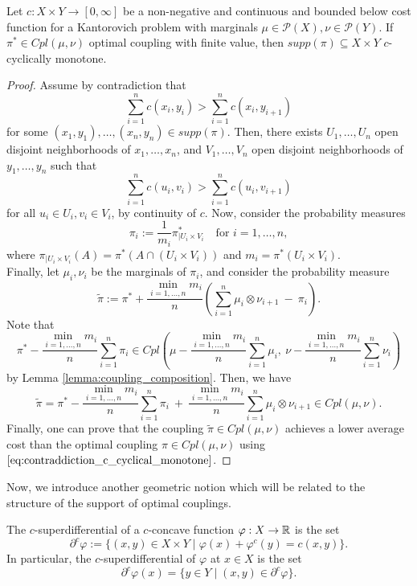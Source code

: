 \documentclass[../main.tex]{subfiles}
\begin{document}
\begin{proposition}
    \label{lemma:optimal_implies_cm}
    Let $c: X\times Y \to [0, \infty]$ be a non-negative and continuous and bounded below cost function for a Kantorovich problem with marginals $\mu\in\mathcal{P}(X), \nu\in\mathcal{P}(Y)$. If $\pi^* \in Cpl(\mu, \nu)$ optimal coupling with finite value, then $supp(\pi)\subseteq X\times Y$ $c$-cyclically monotone. 
\end{proposition}
\begin{proof}
    Assume by contradiction that $$\sum_{i=1}^n c(x_i, y_i) > \sum_{i=1}^n c(x_i, y_{i+1})$$ for some $(x_1, y_1), \dots, (x_n, y_n)\in supp(\pi)$. Then, there exists $U_1, \dots, U_n$ open disjoint neighborhoods of $x_1, \dots, x_n$, and $V_1, \dots, V_n$ open disjoint neighborhoods of $y_1, \dots, y_n$ such that 
    \begin{equation}
    \label{eq:contraddiction_c_cyclical_monotone}
        \sum_{i=1}^n c(u_i, v_i) > \sum_{i=1}^n c(u_i, v_{i+1})
    \end{equation}
    for all $u_i\in U_i, v_i\in V_i$, by continuity of $c$. 
    Now, consider the probability measures $$\pi_i := \frac{1}{m_i} \pi^*_{|U_i\times V_i} \quad \text{for $i=1, \dots, n$},$$ where $\pi_{|U_i\times V_i}(A) = \pi^*(A \cap (U_i \times V_i))$ and $m_i = \pi^*(U_i \times V_i)$. \\
    Finally, let $\mu_i, \nu_i$ be the marginals of $\pi_i$, and consider the probability measure
    $$
    \tilde\pi := \pi^* + \frac{\min_{i=1, \dots, n} m_i}{n} \left(\sum_{i=1}^n \mu_i\otimes \nu_{i+1} \ - \ \pi_i \right).
    $$
    Note that 
    $$
    \pi^* - \frac{\min_{i=1,\dots,n} m_i}{n} \sum_{i=1}^n \pi_i \in Cpl\left(\mu - \frac{\min_{i=1,\dots,n} m_i}{n}\sum_{i=1}^n \mu_i, \ \nu - \frac{\min_{i=1,\dots,n} m_i}{n}\sum_{i=1}^n \nu_i\right)
    $$
    by Lemma \ref{lemma:coupling_composition}. Then, we have
    $$
    \tilde \pi = \pi^* - \frac{\min_{i=1,\dots,n} m_i}{n}\sum_{i=1}^n \pi_i \ + \ \frac{\min_{i=1,\dots,n} m_i}{n} \sum_{i=1}^n \mu_i\otimes\nu_{i+1} \in Cpl(\mu, \nu). 
    $$
    Finally, one can prove that the coupling $\tilde \pi\in Cpl(\mu, \nu)$ achieves a lower average cost than the optimal coupling $\pi\in Cpl(\mu, \nu)$ using $\ref{eq:contraddiction_c_cyclical_monotone}$.
\end{proof}

Now, we introduce another geometric notion which will be related to the structure of the support of optimal couplings.

\begin{definition}
    The $c$-superdifferential of a $c$-concave function $\varphi : X \to \mathbb{R}$ is the set $$\partial^c \varphi := \{(x, y)\in  X \times Y \mid \varphi(x) + \varphi^c(y) = c(x, y)\}.$$
    In particular, the $c$-superdifferential of $\varphi$ at $x\in X$ is the set $$\partial^c\varphi(x) = \{y \in Y \mid (x, y)\in \partial^c\varphi\}.$$
\end{definition}
\end{document}
